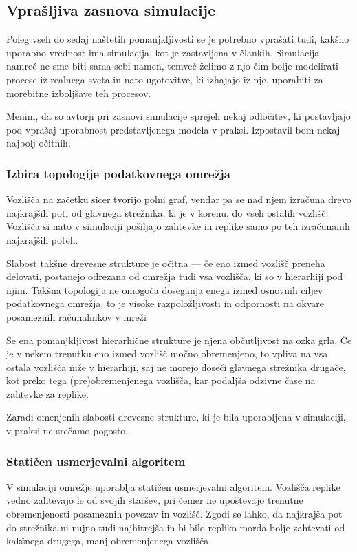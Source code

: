 \documentclass[a4paper, 12pt]{book}
\begin{document}
\subsection{Vprašljiva zasnova simulacije}

Poleg vseh do sedaj naštetih pomanjkljivosti se je potrebno vprašati tudi,
kakšno uporabno vrednost ima simulacija, kot je zastavljena v člankih.
Simulacija namreč ne sme biti sama sebi namen, temveč želimo z njo čim bolje
modelirati procese iz realnega sveta in nato ugotovitve, ki izhajajo iz nje,
uporabiti za morebitne izboljšave teh procesov.

Menim, da so avtorji pri zasnovi simulacije sprejeli nekaj odločitev, ki
postavljajo pod vprašaj uporabnost predstavljenega modela v praksi. Izpostavil
bom nekaj najbolj očitnih.

\subsubsection{Izbira topologije podatkovnega omrežja}

Vozlišča na začetku sicer tvorijo polni graf, vendar pa se nad njem izračuna
drevo najkrajših poti od glavnega strežnika, ki je v korenu, do vseh ostalih
vozlišč. Vozlišča si nato v simulaciji pošiljajo zahtevke in replike samo po
teh izračunanih najkrajših poteh.

Slabost takšne drevesne strukture je očitna --- če eno izmed vozlišč
preneha delovati, postanejo odrezana od omrežja tudi vsa vozlišča, ki so v
hierarhiji pod njim. Takšna topologija ne omogoča doseganja enega izmed
osnovnih ciljev podatkovnega omrežja, to je visoke razpoložljivosti in
odpornosti na okvare posameznih računalnikov v mreži

Še ena pomanjkljivost hierarhične strukture je njena občutljivost na ozka grla.
Če je v nekem trenutku eno izmed vozlišč močno obremenjeno, to vpliva na vsa
ostala vozlišča niže v hierarhiji, saj ne morejo doseči glavnega strežnika
drugače, kot preko tega (pre)obremenjenega vozlišča, kar podaljša odzivne
čase na zahtevke za replike.

Zaradi omenjenih slabosti drevesne strukture, ki je bila uporabljena v
simulaciji, v praksi ne srečamo pogosto.

\subsubsection{Statičen usmerjevalni algoritem}

V simulaciji omrežje uporablja statičen usmerjevalni algoritem. Vozlišča
replike vedno zahtevajo le od svojih staršev, pri čemer ne upoštevajo trenutne
obremenjenosti posameznih povezav in vozlišč. Zgodi se lahko, da
najkrajša pot do strežnika ni nujno tudi najhitrejša in bi bilo repliko morda
bolje zahtevati od kakšnega drugega, manj obremenjenega vozlišča.
\end{document}
